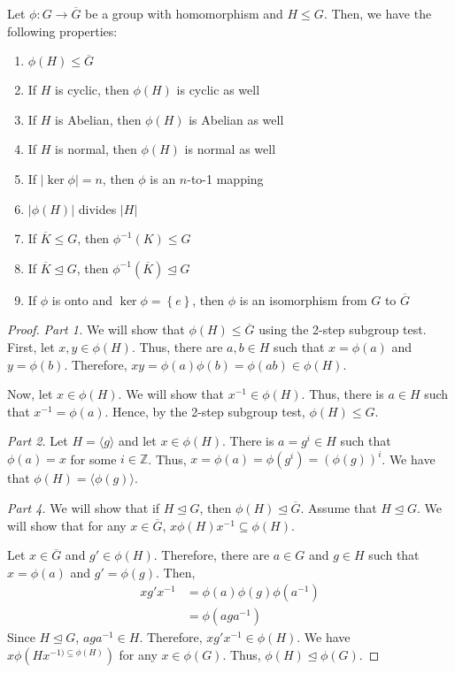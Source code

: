 \begin{theorem}
    Let \(\phi : G \to \overline{G}\) be a group with homomorphism and \(H \leq G\). Then, we have the following properties:
    \begin{enumerate}
        \item \(\phi(H) \leq \overline{G}\)
        \item If \(H\) is cyclic, then \(\phi(H)\) is cyclic as well
        \item If \(H\) is Abelian, then \(\phi(H)\) is Abelian as well
        \item If \(H\) is normal, then \(\phi(H)\) is normal as well
        \item If \(|\ker\phi| = n\), then \(\phi\) is an \(n\)-to-1 mapping
        \item \(|\phi(H)|\) divides \(|H|\)
        \item If \(\overline{K} \leq G\), then \(\phi^{-1}(K) \leq G\)
        \item If \(\overline{K} \unlhd G\), then \(\phi^{-1}(\overline{K}) \unlhd {G}\)
        \item If \(\phi\) is onto and \(\ker\phi = \left\{e\right\}\), then \(\phi\) is an isomorphism from \(G\) to \(\overline{G}\)
    \end{enumerate}
\end{theorem}

\begin{proof}
    \phantom{gg}

    \textit{Part 1.} We will show that \(\phi(H) \leq \overline{G}\) using the 2-step subgroup test. First, let \(x, y \in \phi(H)\). Thus, there are \(a, b \in H\) such that \(x = \phi(a)\) and \(y = \phi(b)\). Therefore, \(xy = \phi(a)\phi(b) = \phi(ab) \in \phi(H)\).

    Now, let \(x \in \phi(H)\). We will show that \(x^{-1} \in \phi(H)\). Thus, there is \(a \in H\) such that \(x^{-1} = \phi(a)\). Hence, by the 2-step subgroup test, \(\phi(H) \leq G\).

    \textit{Part 2.} Let \(H = \langle g \rangle\) and let \(x \in \phi(H)\). There is \(a = g^i \in H\) such that \(\phi(a) = x\) for some \(i \in \mathbb{Z}\). Thus, \(x = \phi(a) = \phi(g^i) = (\phi(g))^i\). We have that \(\phi(H) = \langle \phi(g) \rangle\).

    \textit{Part 4.} We will show that if \(H \unlhd G\), then \(\phi(H) \unlhd \overline{G}\). Assume that \(H \unlhd G\). We will show that for any \(x \in \overline{G}\), \(x\phi(H)x^{-1} \subseteq \phi(H)\). 

    Let \(x \in \overline{G}\) and \(g' \in \phi(H)\). Therefore, there are \(a \in G\) and \(g \in H\) such that \(x = \phi(a)\) and \(g' = \phi(g)\). Then,
    \[
    \begin{aligned}
        xg'x^{-1} &= \phi(a) \phi(g) \phi(a^{-1}) \\
                  &= \phi(aga^{-1})
    \end{aligned}
    \]
    Since \(H \unlhd G\), \(aga^{-1} \in H\). Therefore, \(xg'x^{-1} \in \phi(H)\). We have \(x\phi(Hx^{-1) \subseteq \phi(H)})\) for any \(x \in \phi(G)\). Thus, \(\phi(H) \unlhd \phi(G)\).
\end{proof}

